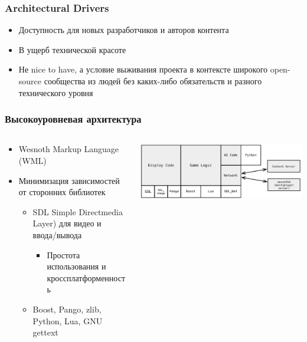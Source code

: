 \documentclass[xetex,mathserif,serif]{beamer}
\begin{document}
	\begin{frame}
		\frametitle{Architectural Drivers}
		\begin{itemize}
			\item Доступность для новых разработчиков и авторов контента
			\item В ущерб технической красоте
			\item Не nice to have, а условие выживания проекта в контексте широкого open-source сообщества из людей без каких-либо обязательств и разного технического уровня
		\end{itemize}
	\end{frame}

	\begin{frame}
		\frametitle{Высокоуровневая архитектура}
		\begin{columns}
			\begin{column}{0.6\textwidth}
				\begin{itemize}
					\item Wesnoth Markup Language (WML)
					\item Минимизация зависимостей от сторонних библиотек
					\begin{itemize}
						\item SDL Simple Directmedia Layer) для видео и ввода/вывода
						\begin{itemize}
							\item Простота использования и кроссплатформенность
						\end{itemize}
						\item Boost, Pango, zlib, Python, Lua, GNU gettext
					\end{itemize}
				\end{itemize}
			\end{column}
			\begin{column}{0.4\textwidth}
				\includegraphics[width=\textwidth]{wesnothArchitecture.png}
			\end{column}
		\end{columns}
	\end{frame}
\end{document}
